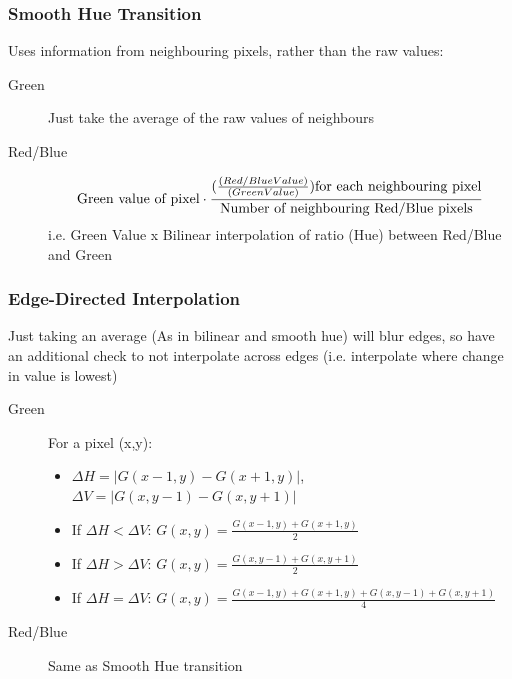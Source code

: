 \subsubsection{Smooth Hue Transition}
Uses information from neighbouring pixels, rather than the raw values:
\begin{description}
    \item[Green] Just take the average of the raw values of neighbours
    \item[Red/Blue] \begin{equation}
        \text{Green value of pixel} \cdot \frac{(\frac{\text(Red/Blue Value)}{(Green Value)}) \text{for each neighbouring pixel}}{\text{Number of neighbouring Red/Blue pixels}} 
    \end{equation}
    i.e. Green Value x Bilinear interpolation of ratio (Hue) between Red/Blue and Green
\end{description}

\subsubsection{Edge-Directed Interpolation}
Just taking an average (As in bilinear and smooth hue) will blur edges, so have an additional check to not interpolate across edges (i.e. interpolate where change in value is lowest) 
\begin{description}
    \item[Green] For a pixel (x,y): 
    \begin{itemize}
        \item $\Delta H = |G(x-1,y) - G(x+1,y)|$, $\Delta V = |G(x,y-1) - G(x,y+1)|$
        \item If $\Delta H < \Delta V$: $G(x,y) =\frac{ G(x-1,y) + G(x+1,y)}{2}$
        \item If $\Delta H > \Delta V$: $G(x,y) =\frac{ G(x,y-1) + G(x,y+1)}{2}$
        \item If $\Delta H = \Delta V$: $G(x,y) =\frac{ G(x-1,y) + G(x+1,y) + G(x,y-1) + G(x,y+1)}{4}$        
    \end{itemize}
    \item[Red/Blue] Same as Smooth Hue transition
\end{description}

